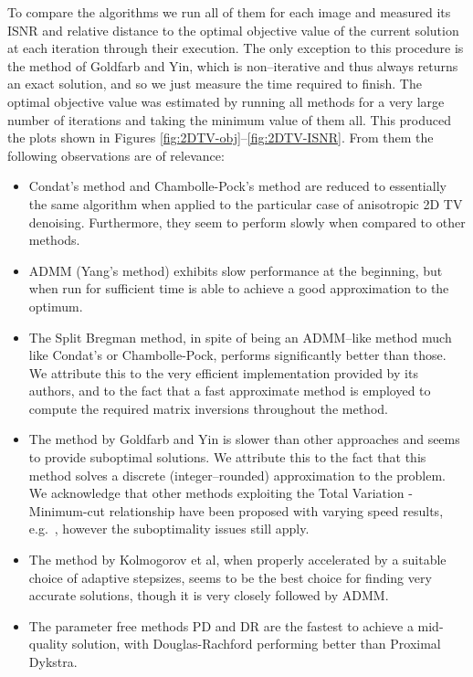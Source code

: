 \documentclass[twoside,11pt]{article}
\numberwithin{equation}{section}
\numberwithin{theorem}{section}
\begin{document}
To compare the algorithms we run all of them for each image and measured its ISNR and relative distance to the optimal objective value of the current solution at each iteration through their execution. The only exception to this procedure is the method of Goldfarb and Yin, which is non--iterative and thus always returns an exact solution, and so we just measure the time required to finish. The optimal objective value was estimated by running all methods for a very large number of iterations and taking the minimum value of them all. This produced the plots shown in Figures \ref{fig:2DTV-obj}--\ref{fig:2DTV-ISNR}. From them the following observations are of relevance:
\begin{itemize}
  \setlength{\itemsep}{1pt}
 \item Condat's method and Chambolle-Pock's method are reduced to essentially the same algorithm when applied to the particular case of anisotropic 2D TV denoising. Furthermore, they seem to perform slowly when compared to other methods.
 \item ADMM (Yang's method) exhibits slow performance at the beginning, but when run for sufficient time is able to achieve a good approximation to the optimum.
 \item The Split Bregman method, in spite of being an ADMM--like method much like Condat's or Chambolle-Pock, performs significantly better than those. We attribute this to the very efficient implementation provided by its authors, and to the fact that a fast approximate method is employed to compute the required matrix inversions throughout the method.
 \item The method by Goldfarb and Yin is slower than other approaches and seems to provide suboptimal solutions. We attribute this to the fact that this method solves a discrete (integer--rounded) approximation to the problem. We acknowledge that other methods exploiting the Total Variation - Minimum-cut relationship have been proposed with varying speed results, e.g.~\citep{DuanTV}, however the suboptimality issues still apply.
 \item The method by Kolmogorov et al, when properly accelerated by a suitable choice of adaptive stepsizes, seems to be the best choice for finding very accurate solutions, though it is very closely followed by ADMM.
 \item The parameter free methods PD and DR are the fastest to achieve a mid-quality solution, with Douglas-Rachford performing better than Proximal Dykstra.
\end{itemize}
\end{document}
